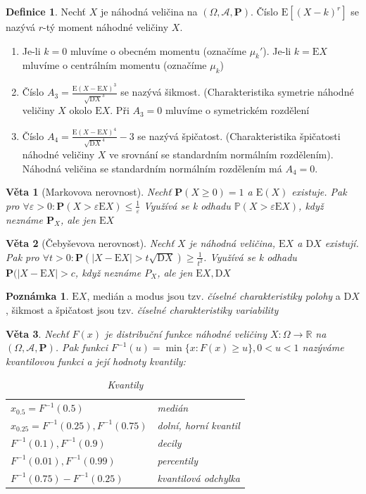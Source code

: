 \documentclass[a4]{report}
\newtheorem{theorem}{Věta}
\theoremstyle{definition}
\newtheorem{definition}{Definice}[section]
\newtheorem{notes}{Poznámka}[section]
\begin{document}
{\begin{definition}
Nechť $X$ je náhodná veličina na $(\Omega,\mathcal{A},\textbf{P})$. Číslo $\mathrm{E}[(X-k)^r]$ se nazývá $r$-tý moment náhodné veličiny $X$.
\end{definition}
\begin{enumerate}
\item Je-li $k=0$ mluvíme o obecném momentu (označíme $\mu_k'$). Je-li $k=\mathrm{E}X$ mluvíme o centrálním momentu (označíme $\mu_k$)
\item Číslo $A_3=\frac{\mathrm{E}(X-\mathrm{E}X)^3}{\sqrt{\mathrm{D}X}^3}$ se nazývá šikmost. (Charakteristika symetrie náhodné veličiny $X$ okolo $\mathrm{E}X$. Při $A_3=0$ mluvíme o symetrickém rozdělení
\item Číslo $A_4=\frac{\mathrm{E}(X-\mathrm{E}X)^4}{\sqrt{\mathrm{D}X}^4}-3$ se nazývá špičatost. (Charakteristika špičatosti náhodné veličiny $X$ ve srovnání se standardním normálním rozdělením). Náhodná veličina se standardním normálním rozdělením má $A_4=0$.
\end{enumerate}

\begin{theorem}[Markovova nerovnost] Nechť $\textbf{P}(X \geq 0) = 1$   a $\mathrm{E}(X)$ existuje. Pak pro $\forall \varepsilon > 0: \textbf{P}(X>\varepsilon\mathrm{E}X) \leq \frac{1}{\varepsilon}$
Využívá se k odhadu $\mathbb{P}(X>\varepsilon\mathrm{E}X)$, když neznáme $\textbf{P}_X$, ale jen $\mathrm{E}X$
\end{theorem}

\begin{theorem}[Čebyševova nerovnost] Nechť $X$ je náhodná veličina, $\mathrm{E}X$ a $\mathrm{D}X$ existují. Pak pro $\forall t > 0 : \textbf{P}(|X-\mathrm{E}X|>t\sqrt{\mathrm{D}X})\geq \frac{1}{t^2}$.
Využívá se k odhadu $\textbf{P}(|X-\mathrm{E}X|>c$, když neznáme $P_X$, ale jen $\mathrm{E}X, \mathrm{D}X$ 
\end{theorem}


\begin{notes}
$\mathrm{E}X$, medián a modus jsou tzv. \textit{číselné charakteristiky polohy} a $\mathrm{D}X$, šikmost a špičatost jsou tzv. \textit{číselné charakteristiky variability}
\end{notes}


\begin{theorem}
Nechť $F(x)$ je distribuční funkce náhodné veličiny $X: \Omega \rightarrow \mathbb{R}$ na  $(\Omega,\mathcal{A},\textbf{P})$. Pak funkci $F^{-1}(u)= \min \{x:F(x)\geq u\}, 0 <u<1$ nazýváme kvantilovou funkci a její hodnoty kvantily:
\begin{table}[h]
\centering
\caption{Kvantily}
\begin{tabular}{ll}
$x_{0.5}=F^{-1}(0.5)$ & medián  \\
$x_{0.25}=F^{-1}(0.25),F^{-1}(0.75)$ & dolní, horní kvantil  \\
$F^{-1}(0.1),F^{-1}(0.9)$ & decily  \\
$F^{-1}(0.01),F^{-1}(0.99)$ & percentily  \\
$F^{-1}(0.75)-F^{-1}(0.25)$ & kvantilová odchylka
\end{tabular}
\end{table}
\end{theorem}


}
\end{document}

